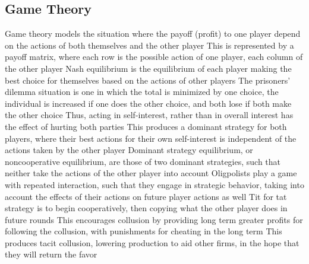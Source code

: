 \documentclass[11 pt, twoside]{article}
\newenvironment{outline*}
{
	\begin{outline}[enumerate]
	}
	{\end{outline}
}
\begin{document}
\subsection{Game Theory}
\begin{outline*}
\1 Game theory models the situation where the payoff (profit) to one player depend on the actions of both themselves and the other player
\2 This is represented by a payoff matrix, where each row is the possible action of one player, each column of the other player
\2 Nash equilibrium is the equilibrium of each player making the best choice for themselves based on the actions of other players
\1 The prisoners' dilemma situation is one in which the total is minimized by one choice, the individual is increased if one does the other choice, and both lose if both make the other choice
\2 Thus, acting in self-interest, rather than in overall interest has the effect of hurting both parties
\2 This produces a dominant strategy for both players, where their best actions for their own self-interest is independent of the actions taken by the other player
\2 Dominant strategy equilibrium, or noncooperative equilibrium, are those of two dominant strategies, such that neither take the actions of the other player into account
\1 Oligpolists play a game with repeated interaction, such that they engage in strategic behavior, taking into account the effects of their actions on future player actions as well
\2 Tit for tat strategy is to begin cooperatively, then copying what the other player does in future rounds
\3 This encourages collusion by providing long term greater profits for following the collusion, with punishments for cheating in the long term
\2 This produces tacit collusion, lowering production to aid other firms, in the hope that they will return the favor
\end{outline*}
\end{document}
